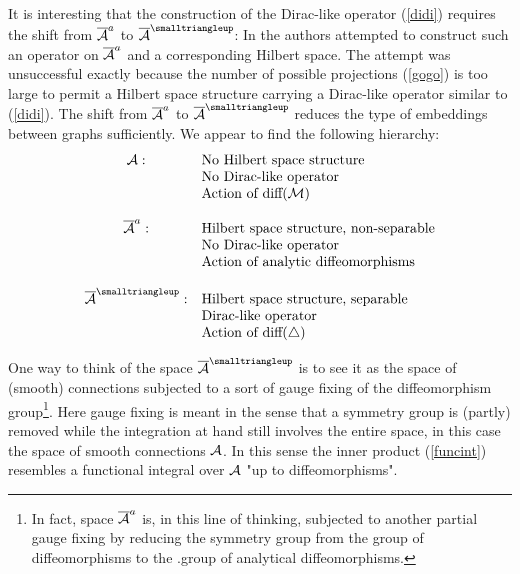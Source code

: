 \documentclass[12pt]{article}
\newcommand{\nn}{\nonumber}
\def\ca{{\cal A}}
\def\cm{{\cal M}}
\begin{document}
It is interesting that the construction of the Dirac-like operator (\ref{didi}) requires the shift from $\overline{\ca}^{\small a}$ to $\overline{\ca}^{\smalltriangleup}$: In \cite{Aastrup:2005yk} the authors attempted to construct such an operator on $\overline{\ca}^{\small a}$ and a corresponding Hilbert space. The attempt was unsuccessful exactly because the number of possible projections (\ref{gogo}) is too large to permit a Hilbert space structure carrying a Dirac-like operator similar to (\ref{didi}). The shift from $\overline{\ca}^{\small a}$ to $\overline{\ca}^{\smalltriangleup}$ reduces the type of embeddings between graphs sufficiently.
We appear to find the following hierarchy:
\[
\begin{array}{cl}
\ca: & \mbox{No Hilbert space structure}\nn\\
     & \mbox{No Dirac-like operator}\nn\\
     & \mbox{Action of diff($\cm$)}\nn\\
     &\nn\\
\overline{\ca}^{\small a}: & \mbox{Hilbert space structure, non-separable}\nn\\
& \mbox{No Dirac-like operator}\nn\\
& \mbox{Action of analytic diffeomorphisms}\nn\\
&\nn\\
\overline{\ca}^{\smalltriangleup}:& \mbox{Hilbert space structure, separable}\nn\\
& \mbox{Dirac-like operator}\nn\\
& \mbox{Action of diff($\triangle$)}\nn
\end{array}
\]





One way to think of the space $\overline{\ca}^{\smalltriangleup}$ is to see it as the space of (smooth) connections subjected to a sort of gauge fixing of the diffeomorphism group\footnote{In fact, space $\overline{\ca}^{\small a}$ is, in this line of thinking, subjected to another partial gauge fixing by reducing the symmetry group from the group of diffeomorphisms to the .group of analytical diffeomorphisms.}. Here gauge fixing is meant in the sense that a symmetry group is (partly) removed while the integration at hand still involves the entire space, in this case the space of smooth connections $\ca$. In this sense the inner product (\ref{funcint}) resembles a functional integral over $\ca$ "up to diffeomorphisms".

 
\end{document}
